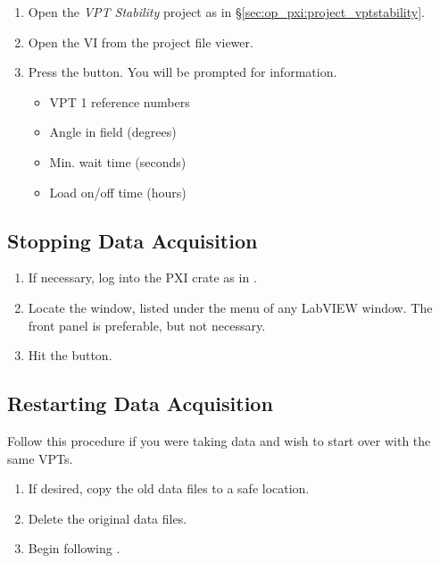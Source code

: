 \begin{enumerate}
\item Open the \textit{VPT Stability} project as in \S\ref{sec:op_pxi:project_vptstability}.
\item Open the  VI from the project file viewer.
\item Press the   button.  You will be prompted for information.
  \begin{itemize}
  \item VPT 1 reference numbers
  \item Angle in field (degrees)
  \item Min.{} wait time (seconds)
  \item Load on/off time (hours)
  \end{itemize}
\end{enumerate}

\subsection{Stopping Data Acquisition}
\label{sec:op_pxi:daq_stop}



\begin{enumerate}
\item If necessary, log into the PXI crate as in .
\item Locate the  window, listed under the  menu of any LabVIEW window.  The front panel is preferable, but not necessary.
\item Hit the   button.
\end{enumerate}

\subsection{Restarting Data Acquisition}
\label{sec:op_pxi:daq_restart}

Follow this procedure if you were taking data and wish to start over with the same VPTs.
\begin{enumerate}
\item If desired, copy the old data files to a safe location.
\item Delete the original data files.
\item Begin following .
\end{enumerate}

